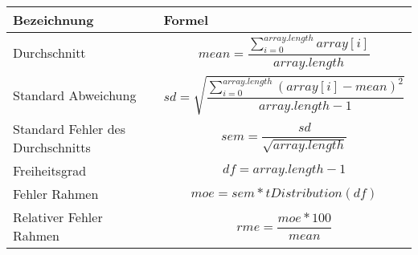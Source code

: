 \label{anhang2}
\begin{table}[h]
	\centering
	\begin{tabular}{m{5cm}m{8cm}}
		\textbf{Bezeichnung} & \textbf{Formel}\\
		\hline
		Durchschnitt & 
		\begin{equation}
		mean=\frac{\sum_{i=0}^{array.length}array[i]}{array.length}
		\end{equation}\\
		
		Standard Abweichung &
		\begin{equation}
		sd=\sqrt{\frac{\sum_{i=0}^{array.length}(array[i]-mean)^2}{array.length-1}}
		\end{equation}\\
		
		Standard Fehler des Durchschnitts &
		\begin{equation}
		sem=\frac{sd}{\sqrt{array.length}}
		\end{equation}\\
		
		Freiheitsgrad &
		\begin{equation}
		df=array.length-1
		\end{equation}\\
		
		Fehler Rahmen &
		\begin{equation}
		moe=sem*tDistribution(df)
		\end{equation}\\
		
		Relativer Fehler Rahmen &
		\begin{equation}
		rme=\frac{moe*100}{mean}
		\end{equation}\\
	\end{tabular}
\end{table}